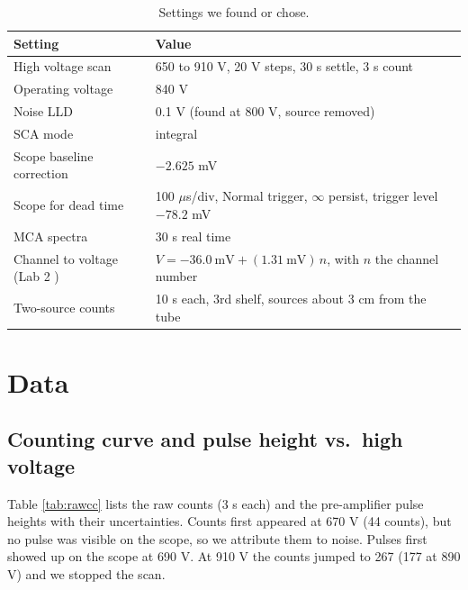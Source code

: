 \documentclass[12pt]{article}
\begin{document}
\begin{table}[!htbp]
\centering\small
\begin{tabular}{ll}
\toprule
\textbf{Setting} & \textbf{Value} \\
\midrule
High voltage scan & 650 to 910 V, 20 V steps, 30 s settle, 3 s count \\
Operating voltage & 840 V \\
Noise LLD & 0.1 V (found at 800 V, source removed) \\
SCA mode & integral \\
Scope baseline correction & $-2.625$ mV \\
Scope for dead time & 100 $\mu$s/div, Normal trigger, $\infty$ persist, trigger level $-78.2$ mV \\
MCA spectra & 30 s real time \\
Channel to voltage (Lab 2 \cite{lab2}) & $V = -36.0\ \text{mV} + (1.31\ \text{mV})\,n$, with $n$ the channel number \\
Two-source counts & 10 s each, 3rd shelf, sources about 3 cm from the tube \\
\bottomrule
\end{tabular}
\caption{Settings we found or chose.}
\label{tab:settings}
\end{table}


\section{Data}

\subsection{Counting curve and pulse height vs.\ high voltage}

Table \ref{tab:rawcc} lists the raw counts (3 s each) and the pre-amplifier pulse heights with their uncertainties. Counts first appeared at 670 V (44 counts), but no pulse was visible on the scope, so we attribute them to noise. Pulses first showed up on the scope at 690 V. At 910 V the counts jumped to 267 (177 at 890 V) and we stopped the scan.
\end{document}
